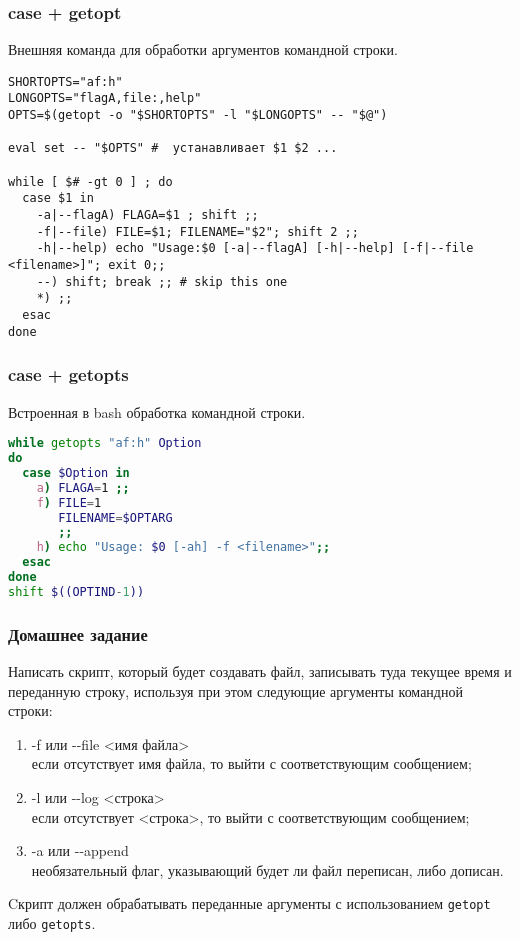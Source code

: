 \begin{frame}[fragile]
\frametitle{case + getopt}
	Внешняя команда для обработки аргументов командной строки.
	\small
	\begin{lstlisting}
SHORTOPTS="af:h"
LONGOPTS="flagA,file:,help"
OPTS=$(getopt -o "$SHORTOPTS" -l "$LONGOPTS" -- "$@")

eval set -- "$OPTS" #  устанавливает $1 $2 ...

while [ $# -gt 0 ] ; do
  case $1 in
    -a|--flagA) FLAGA=$1 ; shift ;;
    -f|--file) FILE=$1; FILENAME="$2"; shift 2 ;;
    -h|--help) echo "Usage:$0 [-a|--flagA] [-h|--help] [-f|--file <filename>]"; exit 0;;
    --) shift; break ;; # skip this one
    *) ;;
  esac
done
\end{lstlisting}
\end{frame}


\begin{frame}[fragile]
	\frametitle{case + getopts}
	
	Встроенная в bash обработка командной строки.

\begin{lstlisting}[language=sh,frame=single]
while getopts "af:h" Option
do
  case $Option in 
    a) FLAGA=1 ;;
    f) FILE=1
       FILENAME=$OPTARG
       ;;
    h) echo "Usage: $0 [-ah] -f <filename>";;
  esac  
done
shift $((OPTIND-1))
\end{lstlisting}
\end{frame}


\begin{frame}
\frametitle{Домашнее задание}

	Написать скрипт, который будет создавать файл, 
	записывать туда текущее время и переданную строку,
	используя при этом следующие аргументы командной строки: 

	\begin{enumerate}
		\item -f или -{}-file <имя файла>\\
			если отсутствует имя файла, то выйти с соответствующим сообщением;
		\item -l или -{}-log <строка>\\
			если отсутствует <строка>, то выйти с соответствующим сообщением;
		\item -a или -{}-append \\
			необязательный флаг, указывающий будет ли файл переписан, либо дописан.
	\end{enumerate}

	Cкрипт должен обрабатывать переданные аргументы с использованием {\tt getopt} либо {\tt getopts}.

\end{frame}

